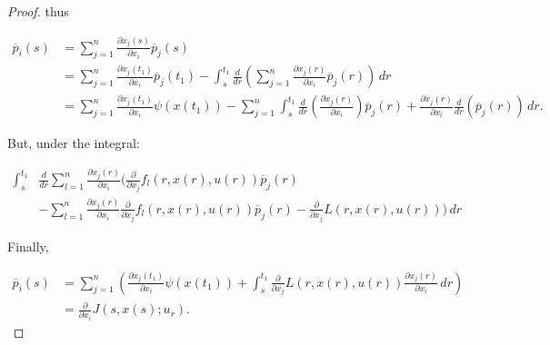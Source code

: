 \begin{theorem}
\begin{proof}
        thus

        \begin{align*}
            \overline{p}_i(s)  & = \sum_{j=1}^n \frac{\partial x_j(s)}{\partial x_i}\overline{p}_j(s) \\
            & = \sum_{j=1}^n \frac{\partial x_j(t_1)}{\partial x_i}\overline{p}_j(t_1) - \int_s^{t_1} \frac{d}{dr}\left(\sum_{j=1}^n \frac{\partial x_j(r)}{\partial x_i}\overline{p}_j(r)\right) \,dr \\
            & = \sum_{j=1}^n \frac{\partial x_j(t_1)}{\partial x_i}\psi(x(t_1)) - \sum_{j=1}^n \int_s^{t_1} \frac{d}{dr}\left(\frac{\partial x_j(r)}{\partial x_i}\right)\overline{p}_j(r) + \frac{\partial x_j(r)}{\partial x_i}\frac{d}{dr}\left(\overline{p}_j(r)\right) \,dr. 
        \end{align*}

        But, under the integral:

        \begin{align*}
            \int_s^{t_1} & \frac{d}{dr}\sum_{l=1}^n \frac{\partial x_j(r)}{\partial x_i}\Bigg(\frac{\partial}{\partial x_j}f_l(r,x(r),u(r))\overline{p}_j(r) \\
            & - \sum_{l=1}^n \frac{\partial x_j(r)}{\partial x_i}\frac{\partial}{\partial x_j}f_l(r,x(r),u(r))\overline{p}_j(r) - \frac{\partial}{\partial x_j}L(r,x(r),u(r))\Bigg) \,dr
        \end{align*}

        Finally, 

        \begin{align*}
            \overline{p}_i(s) & = \sum_{j=1}^n \left(\frac{\partial x_j(t_1)}{\partial x_i}\psi(x(t_1)) + \int_s^{t_1} \frac{\partial}{\partial x_j}L(r,x(r),u(r))\frac{\partial x_j(r)}{\partial x_i} \,dr\right) \\
            & = \frac{\partial}{\partial x_i}J(s,x(s);u_r).
        \end{align*}
    \end{proof}
\end{theorem}